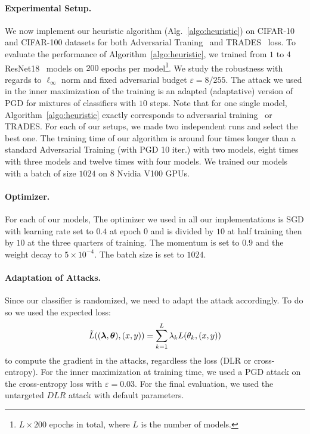 \paragraph{Experimental Setup.} We now implement our heuristic algorithm (Alg.~\ref{algo:heuristic}) on CIFAR-10 and CIFAR-100 datasets for both Adversarial Traning~\citep{madry2017towards} and TRADES~\citep{zhang2019theoretically} loss. To evaluate the performance of Algorithm~\ref{algo:heuristic}, we trained from $1$ to $4$ ResNet18~\citep{He_2016_CVPR} models on $200$ epochs per model\footnote{$L\times200$ epochs in total, where $L$ is the number of models.}. We study the robustness with regards to $\ell_\infty$ norm and fixed adversarial budget $\varepsilon=8/255$. The attack we used in the inner maximization of the training is an adapted (adaptative) version of PGD for mixtures of classifiers with $10$ steps. Note that for one single model, Algorithm~\ref{algo:heuristic} exactly corresponds to adversarial training~\citep{madry2017towards} or TRADES. For each of our setups, we made two independent runs and select the  best one. The training time of our algorithm is around four times longer than a standard Adversarial Training (with PGD 10 iter.) with two models, eight times with three models and twelve times with four models. We trained our models with a batch of size  $1024$ on $8$ Nvidia V100 GPUs. 

\paragraph{Optimizer.} For each of our models, The optimizer we used in all our implementations is SGD with learning rate set to $0.4$ at epoch $0$ and is divided by $10$ at half training then by $10$ at the three quarters of training. The momentum is set to $0.9$ and the weight decay to $5\times10^{-4}$. The batch size is set to $1024$. 
\paragraph{Adaptation of Attacks.} Since our classifier is randomized, we need to adapt the attack accordingly. To do so we used the expected loss:
\begin{align*}
\Tilde{\loss}\left((\bm{\lambda},\bm{\theta}),(x,y)\right) = \sum_{k=1}^L \lambda_k \loss(\theta_k,(x,y))
\end{align*}
to compute the gradient in the attacks, regardless the loss (DLR or cross-entropy). For the inner maximization at training time, we used a PGD attack on the cross-entropy loss with $\varepsilon=0.03$. For the final evaluation, we used the untargeted $DLR$ attack with default parameters.
